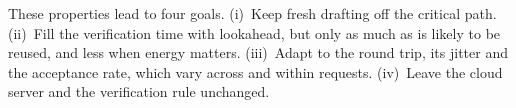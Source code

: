 These properties lead to four goals. (i)~Keep fresh drafting off the critical path. (ii)~Fill the verification time with lookahead, but only as much as is likely to be reused, and less when energy matters. (iii)~Adapt to the round trip, its jitter and the acceptance rate, which vary across and within requests. (iv)~Leave the cloud server and the verification rule unchanged.
